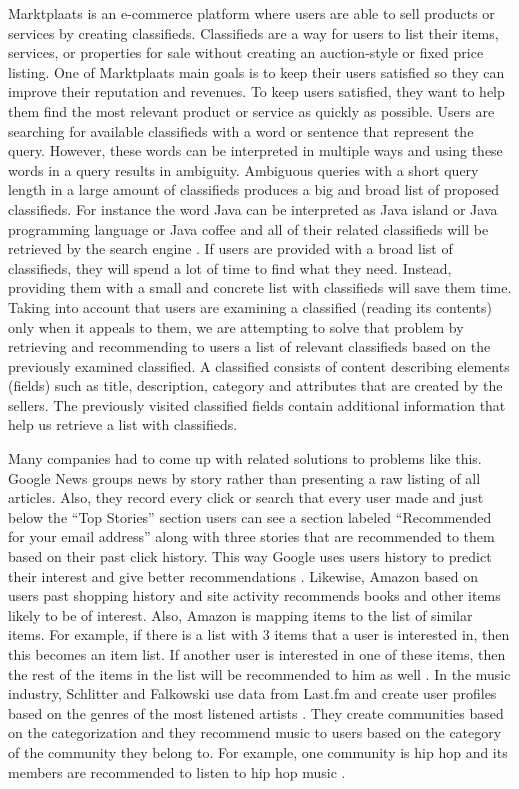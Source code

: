 Marktplaats is an e-commerce platform where users are able to sell products or services by creating classifieds. Classifieds are a way for users to list their items, services, or properties for sale without creating an auction-style or fixed price listing. One of Marktplaats main goals is to keep their users satisfied so they can improve their reputation and revenues. To keep users satisfied, they want to help them find the most relevant product or service as quickly as possible. Users are searching for available classifieds with a word or sentence that represent the query. However, these words can be interpreted in multiple ways and using these words in a query results in ambiguity. Ambiguous queries with a short query length in a large amount of classifieds produces a big and broad list of proposed classifieds. For instance the word Java can be interpreted as Java island or Java programming language or Java coffee and all of their related classifieds will be retrieved by the search engine \cite{RoulSahay}. If users are provided with a broad list of classifieds, they will spend a lot of time to find what they need. Instead, providing them with a small and concrete list with classifieds will save them time. Taking into account that users are examining a classified (reading its contents) only when it appeals to them, we are attempting to solve that problem by retrieving and recommending to users a list of relevant classifieds based on the previously examined classified. A classified consists of content describing elements (fields) such as title, description, category and attributes that are created by the sellers. The previously visited classified fields contain additional information that help us retrieve a list with classifieds.

Many companies had to come up with related solutions to problems like this. Google News groups news by story rather than presenting a raw listing of all articles. Also, they record every click or search that every user made and just below the ``Top Stories'' section users can see a section labeled ``Recommended for your email address'' along with three stories that are recommended to them based on their past click history. This way Google uses users history to predict their interest and give better recommendations \cite{AbhinandanGoogle}. Likewise, Amazon based on users past shopping history and site activity recommends books and other items likely to be of interest. Also, Amazon is mapping items to the list of similar items. For example, if there is a list with 3 items that a user is interested in, then this becomes an item list. If another user is interested in one of these items, then the rest of the items in the list will be recommended to him as well \cite{LindenJacobiBenson}. In the music industry, Schlitter and Falkowski use data from Last.fm and create user profiles based on the genres of the most listened artists \cite{SchlitterFalkowski}. They create communities based on the categorization and they recommend music to users based on the category of the community they belong to. For example, one community is hip hop and its members are recommended to listen to hip hop music \cite{OwenAnil}.

